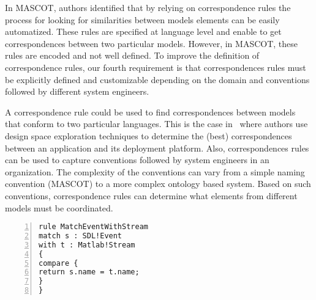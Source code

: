 	
	
	


In MASCOT, authors identified that by relying on correspondence rules the process for looking for similarities between models elements can be easily automatized. These rules are specified at language level and enable to get correspondences between two particular models. However, in MASCOT, these rules are encoded and not well defined. To improve the definition of correspondence rules, our fourth requirement is that correspondences rules must be explicitly defined and customizable depending on the domain and conventions followed by different system engineers.
	
A correspondence rule could be used to find correspondences between models that conform to two particular languages. This is the case in~\cite{kofmanbib} where authors use design space exploration techniques to determine the (best) correspondences between an application and its deployment platform. Also, correspondences rules can be used to capture conventions followed by system engineers in an organization. The complexity of the conventions can vary from a simple naming convention (\eg MASCOT) to a more complex ontology based system. Based on such conventions, correspondence rules can determine what elements from different models must be coordinated.    

\begin{lstlisting}[language=epsilon, caption={The Mascot correspondence rule in the Epsilon Comparison Language}, label={lst:epsilon}, 	basicstyle=\scriptsize\ttfamily, backgroundcolor=\color{LGrey}, numbers=left, xleftmargin=2pt]
rule MatchEventWithStream
match s : SDL!Event
with t : Matlab!Stream 
{
compare {
return s.name = t.name;
}
}
\end{lstlisting}

